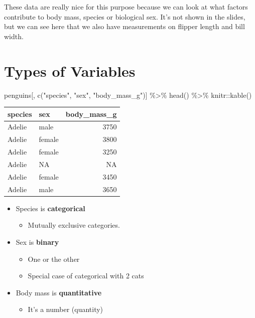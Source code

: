 \documentclass[
  letterpaper,
  DIV=11,
  numbers=noendperiod]{scrreprt}
\newenvironment{Shaded}{\begin{snugshade}}{\end{snugshade}}
\newcommand{\FunctionTok}[1]{\textcolor[rgb]{0.28,0.35,0.67}{#1}}
\newcommand{\NormalTok}[1]{\textcolor[rgb]{0.00,0.23,0.31}{#1}}
\newcommand{\SpecialCharTok}[1]{\textcolor[rgb]{0.37,0.37,0.37}{#1}}
\newcommand{\StringTok}[1]{\textcolor[rgb]{0.13,0.47,0.30}{#1}}
\providecommand{\tightlist}{%
  \setlength{\itemsep}{0pt}\setlength{\parskip}{0pt}}\usepackage{longtable,booktabs,array}
\begin{document}
These data are really nice for this purpose because we can look at what
factors contribute to body mass, species or biological sex. It's not
shown in the slides, but we can see here that we also have measurements
on flipper length and bill width.

\hypertarget{types-of-variables}{%
\section{Types of Variables}\label{types-of-variables}}

\begin{Shaded}
\begin{Highlighting}[]
\NormalTok{penguins[, }\FunctionTok{c}\NormalTok{(}\StringTok{"species"}\NormalTok{, }\StringTok{"sex"}\NormalTok{, }\StringTok{"body\_mass\_g"}\NormalTok{)] }\SpecialCharTok{\%\textgreater{}\%}
    \FunctionTok{head}\NormalTok{() }\SpecialCharTok{\%\textgreater{}\%}
\NormalTok{    knitr}\SpecialCharTok{::}\FunctionTok{kable}\NormalTok{()}
\end{Highlighting}
\end{Shaded}

\begin{longtable}[]{@{}llr@{}}
\toprule\noalign{}
species & sex & body\_mass\_g \\
\midrule\noalign{}
\endhead
\bottomrule\noalign{}
\endlastfoot
Adelie & male & 3750 \\
Adelie & female & 3800 \\
Adelie & female & 3250 \\
Adelie & NA & NA \\
Adelie & female & 3450 \\
Adelie & male & 3650 \\
\end{longtable}

\begin{itemize}
\tightlist
\item
  Species is \textbf{categorical}

  \begin{itemize}
  \tightlist
  \item
    Mutually exclusive categories.\lspace
  \end{itemize}
\item
  Sex is \textbf{binary}

  \begin{itemize}
  \tightlist
  \item
    One or the other
  \item
    Special case of categorical with 2 cats\lspace
  \end{itemize}
\item
  Body mass is \textbf{quantitative}

  \begin{itemize}
  \tightlist
  \item
    It's a number (quantity)
  \end{itemize}
\end{itemize}
\end{document}
